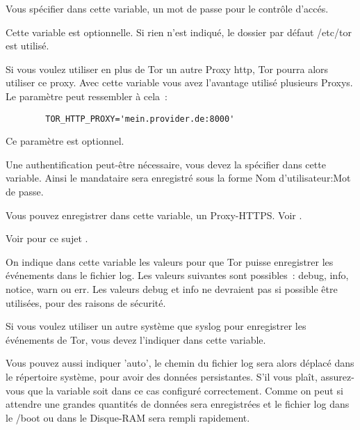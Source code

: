 \begin{description}
        Vous spécifier dans cette variable, un mot de passe pour le contrôle
        d'accés.


        Cette variable est optionnelle. Si rien n'est indiqué, le dossier par
        défaut /etc/tor est utilisé.


        {Si vous voulez utiliser en plus de Tor un autre Proxy http, Tor pourra
        alors utiliser ce proxy. Avec cette variable vous avez l'avantage utilisé
        plusieurs Proxys. Le paramètre peut ressembler à cela~:

\begin{example}
\begin{verbatim}
        TOR_HTTP_PROXY='mein.provider.de:8000'
\end{verbatim}
\end{example}

        Ce paramètre est optionnel.}


        Une authentification peut-être nécessaire, vous devez la spécifier
        dans cette variable. Ainsi le mandataire sera enregistré sous la forme
        Nom d'utilisateur:Mot de passe.


        Vous pouvez enregistrer dans cette variable, un Proxy-HTTPS. Voir
        .


        Voir pour ce sujet .


        {On indique dans cette variable les valeurs pour que Tor puisse
        enregistrer les événements dans le fichier log. Les valeurs suivantes
        sont possibles~: debug, info, notice, warn ou err. Les valeurs debug et
        info ne devraient pas si possible être utilisées, pour des raisons
        de sécurité.}


        Si vous voulez utiliser un autre système que syslog pour enregistrer
        les événements de Tor, vous devez l'indiquer dans cette variable.

        Vous pouvez aussi indiquer 'auto', le chemin du fichier log sera alors
        déplacé dans le répertoire système, pour avoir des données persistantes.
        S'il vous plaît, assurez-vous que la variable  soit dans
        ce cas configuré correctement. Comme on peut si attendre une grandes
        quantités de données sera enregistrées et le fichier log dans le /boot
        ou dans le Disque-RAM sera rempli rapidement.
\end{description}
